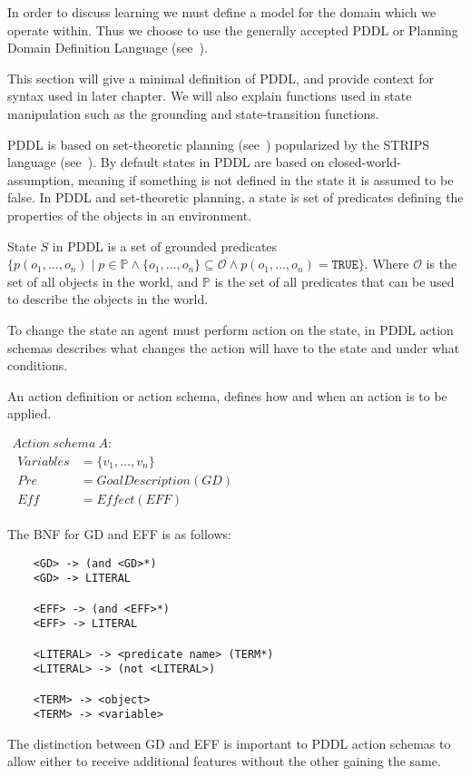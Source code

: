 \documentclass[../Master.tex]{subfiles}
\begin{document}
In order to discuss learning we must define a model for the domain which we operate within. Thus we choose to use the generally accepted PDDL or Planning Domain Definition Language (see~\cite{PDDL}). 

This section will give a minimal definition of PDDL, and provide context for syntax used in later chapter. We will also explain functions used in state manipulation such as the grounding and state-transition functions.


PDDL is based on set-theoretic planning (see~\cite{ghallab2004a}) popularized by the STRIPS language (see~\cite{STRIPS}). By default states in PDDL are based on closed-world-assumption, meaning if something is not defined in the state it is assumed to be false. 
In PDDL and set-theoretic planning, a state is set of predicates defining the properties of the objects in an environment.

\begin{definition} 
	State $S$ in PDDL is a set of grounded predicates $\{p(o_1,\dots,o_n) \mid  p \in \mathbb{P} \land \{o_1,\dots,o_n\} \subseteq \mathcal{O} \land p(o_1,\dots,o_n) = \texttt{TRUE}\}$. Where $\mathcal{O}$ is the set of all objects in the world, and $\mathbb{P}$ is the set of all predicates that can be used to describe the objects in the world.
\end{definition}

To change the state an agent must perform action on the state, in PDDL action schemas describes what changes the action will have to the state and under what conditions. 

	
\begin{definition} \label{def:lrn:action-spec-def}
		An action definition or action schema, defines how and when an action is to be applied. 
		
		$
		\begin{array}{ll}
		Action~schema~A: & \\
		
		\begin{array}{ll}
		Variables & = \{v_1,\dots,v_n\}			 \\  
		Pre	& = Goal Description(GD) \\
		Eff & = Effect(EFF) 
		\end{array}
		\end{array}$
		
		The BNF for GD and EFF is as follows:
		
		\begin{lstlisting}
	<GD> -> (and <GD>*) 
	<GD> -> LITERAL
	
	<EFF> -> (and <EFF>*)
	<EFF> -> LITERAL
	
	<LITERAL> -> <predicate name> (TERM*)
	<LITERAL> -> (not <LITERAL>)
	
	<TERM> -> <object>
	<TERM> -> <variable>
		\end{lstlisting}
		
		The distinction between GD and EFF is important to PDDL action schemas to allow either to receive additional features without the other gaining the same.
	\end{definition}
	
\end{document}
